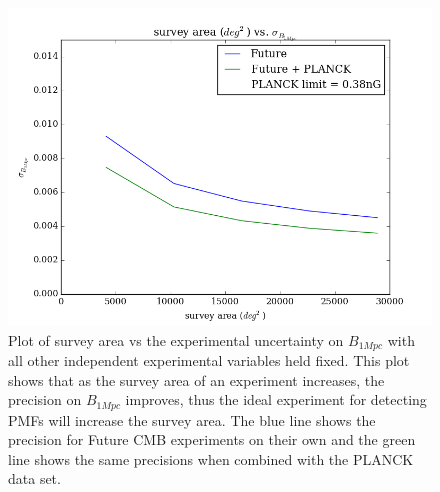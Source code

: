 \begin{figure}[h]
\centering
\includegraphics[scale=0.8]{images/area.png}
\caption{Plot of survey area vs the experimental uncertainty on $B_{1Mpc}$ with all other independent experimental variables held fixed. This plot shows that as the survey area of an experiment increases, the precision on $B_{1Mpc}$ improves, thus the ideal experiment for detecting PMFs will increase the survey area. The blue line shows the precision for Future CMB experiments on their own and the green line shows the same precisions when combined with the PLANCK data set.}
\label{fig:area}
\end{figure}

